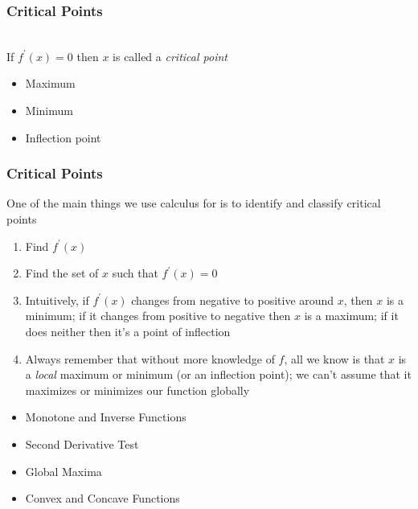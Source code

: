 \documentclass[aspectratio=169]{beamer}
\numberwithin{equation}{section}
\begin{document}
\begin{frame}
\frametitle{Critical Points}

\ \\If $f^\prime(x)=0$ then $x$ is called a \textit{critical point}

\begin{itemize}
\item Maximum
\item Minimum
\item Inflection point
\end{itemize}

\begin{center}
  
\end{center}

\end{frame}



\begin{frame}
\frametitle{Critical Points}

One of the main things we use calculus for is to identify and classify critical points \pause

\begin{enumerate}
\item Find $f^\prime(x)$ \pause
\item Find the set of $x$ such that $f^\prime(x)=0$ \pause
\item Intuitively, if $f^\prime(x)$ changes from negative to positive around $x$, then $x$ is a minimum; if it changes from positive to negative then $x$ is a maximum; if it does neither then it's a point of inflection \pause
\item Always remember that without more knowledge of $f$, all we know is that $x$ is a \textit{local} maximum or minimum (or an inflection point); we can't assume that it maximizes or minimizes our function globally
\end{enumerate}

\end{frame}



\begin{frame}

\begin{itemize}
\item \textcolor{mygray}{Monotone and Inverse Functions}
\item \textcolor{myblack}{Second Derivative Test}
\item \textcolor{mygray}{Global Maxima}
\item \textcolor{mygray}{Convex and Concave Functions}
\end{itemize}

\end{frame}
\end{document}
